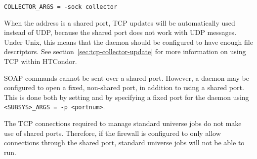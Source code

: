 \begin{verbatim}
COLLECTOR_ARGS = -sock collector
\end{verbatim}

When the  address is a shared port,
TCP updates will be automatically used instead of UDP,
because the shared port does not work with UDP messages.
Under Unix, this means that the
 daemon should be configured to have enough file descriptors.
See section~\ref{sec:tcp-collector-update} for more information on using
TCP within HTCondor.

SOAP commands cannot be sent over a shared port.
However, a daemon may be configured to open a fixed, non-shared port,
in addition to using a shared port.
This is done both by setting
 and by specifying a fixed port for the daemon
using \verb|<SUBSYS>_ARGS = -p <portnum>|.

The TCP connections required to manage standard universe jobs do not
make use of shared ports.  Therefore, if the firewall is configured to
only allow connections through the shared port, standard universe jobs
will not be able to run.

